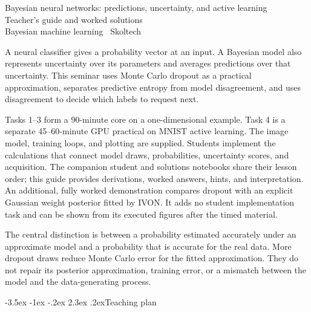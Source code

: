 \documentclass[11pt,a4paper]{article}
\makeatletter
\renewcommand\section{\@startsection{section}{1}{\z@}%
  {-3.5ex \@plus -1ex \@minus -.2ex}%
  {2.3ex \@plus .2ex}{\normalfont\Large}}
\makeatother
\begin{document}
\begin{center}
 {\LARGE Bayesian neural networks: predictions, uncertainty, and active learning}\\[6pt]
 {\large Teacher's guide and worked solutions}\\[3pt]
 Bayesian machine learning \textbar\ Skoltech
\end{center}

A neural classifier gives a probability vector at an input. A Bayesian model
also represents uncertainty over its parameters and averages predictions over
that uncertainty. This seminar uses Monte Carlo dropout as a practical
approximation, separates predictive entropy from model disagreement, and
uses disagreement to decide which labels to request next.

Tasks 1--3 form a 90-minute core on a one-dimensional example. Task 4 is a
separate 45--60-minute GPU practical on MNIST active learning. The image model,
training loops, and plotting are supplied. Students implement the calculations
that connect model draws, probabilities, uncertainty scores, and acquisition.
The companion student and solutions notebooks share their lesson order;
this guide provides derivations, worked answers, hints, and interpretation.
An additional, fully worked demonstration compares dropout with an explicit
Gaussian weight posterior fitted by IVON. It adds no student implementation
task and can be shown from its executed figures after the timed material.

The central distinction is between a probability estimated accurately under
an approximate model and a probability that is accurate for the real data.
More dropout draws reduce Monte Carlo error for the fitted approximation.
They do not repair its posterior approximation, training error, or a mismatch
between the model and the data-generating process.

\section{Teaching plan}
\end{document}

